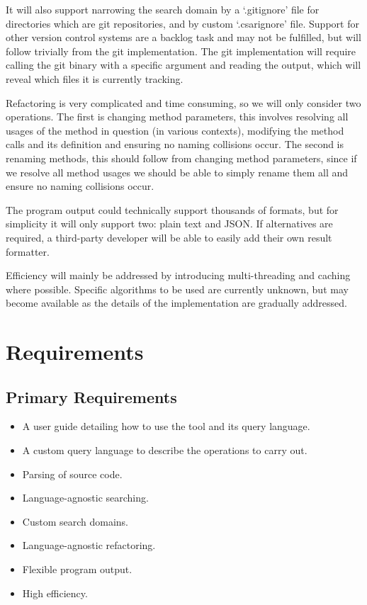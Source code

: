 \documentclass[12pt, letterpaper]{article}
\begin{document}
It will also support narrowing the search domain by a `.gitignore' file for directories which are git repositories, and by custom `.csarignore' file. Support for other version control systems are a backlog task and may not be fulfilled, but will follow trivially from the git implementation.
The git implementation will require calling the git binary with a specific argument and reading the output, which will reveal which files it is currently tracking.

Refactoring is very complicated and time consuming, so we will only consider two operations.
The first is changing method parameters, this involves resolving all usages of the method in question (in various contexts), modifying the method calls and its definition and ensuring no naming collisions occur.
The second is renaming methods, this should follow from changing method parameters, since if we resolve all method usages we should be able to simply rename them all and ensure no naming collisions occur.

The program output could technically support thousands of formats, but for simplicity it will only support two: plain text and JSON.
If alternatives are required, a third-party developer will be able to easily add their own result formatter.

Efficiency will mainly be addressed by introducing multi-threading and caching where possible.
Specific algorithms to be used are currently unknown, but may become available as the details of the implementation are gradually addressed.

\section{Requirements}
\subsection{Primary Requirements}
\begin{itemize}
    \item A user guide detailing how to use the tool and its query language.
    \item A custom query language to describe the operations to carry out.
    \item Parsing of source code.
    \item Language-agnostic searching.
    \item Custom search domains.
    \item Language-agnostic refactoring.
    \item Flexible program output.
    \item High efficiency.
\end{itemize}
\end{document}
